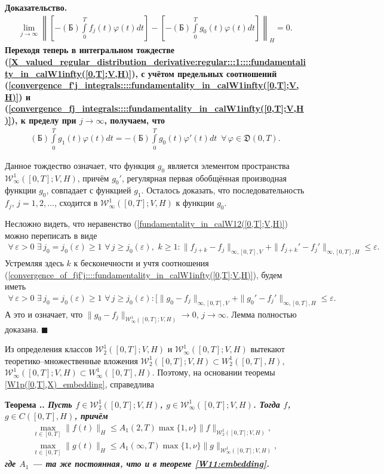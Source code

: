\documentclass{report}
\newcounter{rem}[section]
\newcounter{theor}[section]
\renewcommand{\thetheor}{\thesection.\arabic{theor}}
\newenvironment{Theorem}{\par\refstepcounter{theor}\bf Теорема \thetheor. \it}{\rm\par}
\newenvironment{Proof}{\par\noindent\bf Доказательство.\rm}{ $\blacksquare$\par}
\begin{document}
\begin{Proof}
\begin{gather}
\lim\limits_{j\to\infty}\left\|\left[-(\textrm{Б})\int\limits_0^T f_j(t)\varphi(t)dt\right]-\left[-(\textrm{Б})\int\limits_0^T g_0(t)\varphi(t)dt\right]\right\|_H=0.
\end{gather}
Переходя теперь в интегральном тождестве (\ref{X_valued_regular_distribution_derivative:regular:::1::::fundamentality_in_calW1infty([0,T];V,H)}), с учётом предельных соотношений
(\ref{convergence_f'j_integrals::::fundamentality_in_calW1infty([0,T];V,H)}) и (\ref{convergence_fj_integrals::::fundamentality_in_calW1infty([0,T];V,H)}), к пределу при $j\to\infty$,
получаем, что
\begin{gather*}
(\textrm{Б})\int\limits_0^T g_1(t)\varphi(t)dt=-(\textrm{Б})\int\limits_0^T g_0(t)\varphi'(t)dt\,\,\,\forall\,\varphi\in\mathfrak{D}(0,T).
\end{gather*}

Данное тождество означает, что функция $g_0$ является элементом пространства $\mathcal{W}^1_\infty([0,T];V,H)$, причём  $g_0'$, регулярная первая обобщённая производная функции $g_0$,
совпадает с функцией  $g_1$. Осталось доказать, что последовательность $f_j$, $j=1,2,\dots$, сходится в $\mathcal{W}^1_\infty([0,T];V,H)$ к функции $g_0$.

Несложно видеть, что неравенство (\ref{fundamentality_in_calW12([0,T];V,H)}) можно переписать в виде
\begin{gather*}
\forall\,\varepsilon>0\,\,\exists\,j_0=j_0(\varepsilon)\geqslant1\,\,\forall\,j\geqslant j_0(\varepsilon),\,\,k\geqslant1:
\|f_{j+k}-f_j\|_{\infty,[0,T],V}+\|f_{j+k}'-f_j'\|_{\infty,[0,T],H}\leqslant\varepsilon.
\end{gather*}
Устремляя здесь $k$ к бесконечности и учтя соотношения (\ref{convergence_of_fjf'j::::fundamentality_in_calW1infty([0,T];V,H)}), будем иметь
\begin{gather*}
\forall\,\varepsilon>0\,\,\exists\,j_0=j_0(\varepsilon)\geqslant1\,\,\forall\,j\geqslant j_0(\varepsilon):
[\|g_{0}-f_j\|_{\infty,[0,T],V}+\|g_{0}'-f_j'\|_{\infty,[0,T],H}\leqslant\varepsilon.
\end{gather*}
А это и означает, что $\|g_{0}-f_j\|_{\mathcal{W}^1_\infty([0,T];V,H)}\to0$, $j\to\infty$. Лемма полностью доказана.
\end{Proof}

Из определения классов $\mathcal{W}^1_2([0,T];V,H)$ и $\mathcal{W}^1_\infty([0,T];V,H)$ вытекают теоретико--множественные вложения $\mathcal{W}^1_2([0,T];V,H)\subset W^1_2([0,T],H)$,
$\mathcal{W}^1_\infty([0,T];V,H)\subset W^1_\infty([0,T],H)$. Поэтому, на основании теоремы \ref{W1p([0,T],X)_embedding}, справедлива
\begin{Theorem} Пусть $f\in \mathcal{W}^1_2([0,T];V,H)$, $g\in \mathcal{W}^1_\infty([0,T];V,H)$. Тогда $f$, $g\in C([0,T],H)$, причём
\begin{gather*}
\max\limits_{t\in[0,T]}\|f(t)\|_H\leqslant A_1(2,T)\max\{1,\nu\}\|f\|_{\mathcal{W}^1_2([0,T];V,H)},\\
\max\limits_{t\in[0,T]}\|g(t)\|_H\leqslant A_1(\infty,T)\max\{1,\nu\}\|g\|_{\mathcal{W}^1_\infty([0,T];V,H)},
\end{gather*}
где $A_1$ --- та же постоянная, что и в теореме \ref{W11:embedding}.
\end{Theorem}
\end{document}
